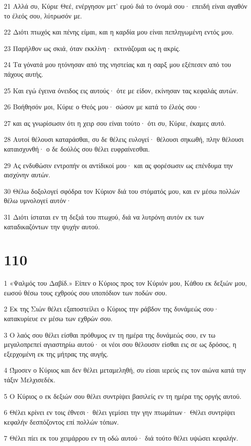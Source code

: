 \par 21 Αλλά συ, Κύριε Θεέ, ενέργησον μετ' εμού διά το όνομά σου· επειδή είναι αγαθόν το έλεός σου, λύτρωσόν με.
\par 22 Διότι πτωχός και πένης είμαι, και η καρδία μου είναι πεπληγωμένη εντός μου.
\par 23 Παρήλθον ως σκιά, όταν εκκλίνη· εκτινάζομαι ως η ακρίς.
\par 24 Τα γόνατά μου ητόνησαν από της νηστείας και η σαρξ μου εξέπεσεν από του πάχους αυτής.
\par 25 Και εγώ έγεινα όνειδος εις αυτούς· ότε με είδον, εκίνησαν τας κεφαλάς αυτών.
\par 26 Βοήθησόν μοι, Κύριε ο Θεός μου· σώσον με κατά το έλεός σου·
\par 27 και ας γνωρίσωσιν ότι η χειρ σου είναι τούτο· ότι συ, Κύριε, έκαμες αυτό.
\par 28 Αυτοί θέλουσι καταράσθαι, συ δε θέλεις ευλογεί· θέλουσι σηκωθή, πλην θέλουσι καταισχυνθή· ο δε δούλός σου θέλει ευφραίνεσθαι.
\par 29 Ας ενδυθώσιν εντροπήν οι αντίδικοί μου· και ας φορέσωσιν ως επένδυμα την αισχύνην αυτών.
\par 30 Θέλω δοξολογεί σφόδρα τον Κύριον διά του στόματός μου, και εν μέσω πολλών θέλω υμνολογεί αυτόν·
\par 31 Διότι ίσταται εν τη δεξιά του πτωχού, διά να λυτρόνη αυτόν εκ των καταδικαζόντων την ψυχήν αυτού.

\chapter{110}

\par 1 «Ψαλμός του Δαβίδ.» Είπεν ο Κύριος προς τον Κύριόν μου, Κάθου εκ δεξιών μου, εωσού θέσω τους εχθρούς σου υποπόδιον των ποδών σου.
\par 2 Εκ της Σιών θέλει εξαποστείλει ο Κύριος την ράβδον της δυνάμεώς σου· κατακυρίευε εν μέσω των εχθρών σου.
\par 3 Ο λαός σου θέλει είσθαι πρόθυμος εν τη ημέρα της δυνάμεώς σου, εν τω μεγαλοπρεπεί αγιαστηρίω αυτού· οι νέοι σου θέλουσιν είσθαι εις σε ως δρόσος, η εξερχομένη εκ της μήτρας της αυγής.
\par 4 Ώμοσεν ο Κύριος και δεν θέλει μεταμεληθή, συ είσαι ιερεύς εις τον αιώνα κατά την τάξιν Μελχισεδέκ.
\par 5 Ο Κύριος ο εκ δεξιών σου θέλει συντρίψει βασιλείς εν τη ημέρα της οργής αυτού.
\par 6 Θέλει κρίνει εν τοις έθνεσι· θέλει γεμίσει την γην πτωμάτων· Θέλει συντρίψει κεφαλήν δεσπόζοντος επί πολλών τόπων.
\par 7 Θέλει πίει εκ του χειμάρρου εν τη οδώ αυτού· διά τούτο θέλει υψώσει κεφαλήν.

